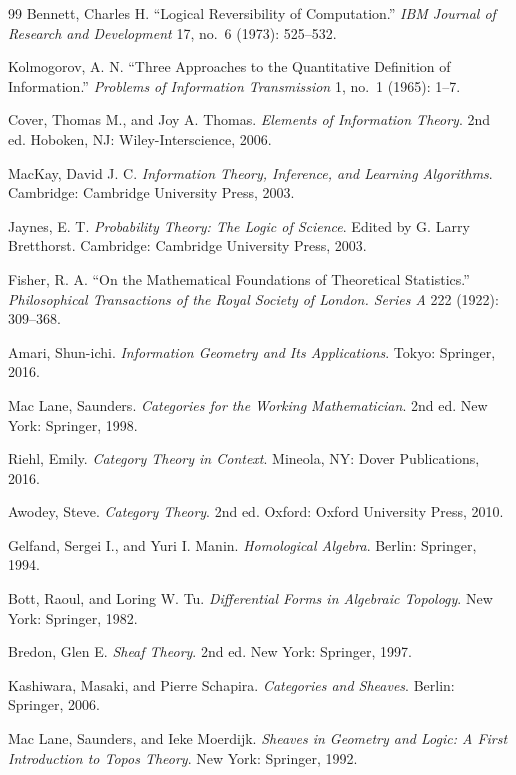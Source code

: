 \documentclass[
  11pt,
  a4paper,
  DIV=12,
  BCOR=0mm,
  parskip=half-
]{scrartcl}
\theoremstyle{definition}
\theoremstyle{plain}
\theoremstyle{remark}
\begin{document}
\begin{thebibliography}{99}
Bennett, Charles H.
``Logical Reversibility of Computation.''
\emph{IBM Journal of Research and Development}
17, no.~6 (1973): 525--532.

Kolmogorov, A. N.
``Three Approaches to the Quantitative Definition of Information.''
\emph{Problems of Information Transmission}
1, no.~1 (1965): 1--7.

Cover, Thomas M., and Joy A. Thomas.
\emph{Elements of Information Theory}.
2nd ed.
Hoboken, NJ: Wiley-Interscience, 2006.

MacKay, David J. C.
\emph{Information Theory, Inference, and Learning Algorithms}.
Cambridge: Cambridge University Press, 2003.

Jaynes, E. T.
\emph{Probability Theory: The Logic of Science}.
Edited by G. Larry Bretthorst.
Cambridge: Cambridge University Press, 2003.

Fisher, R. A.
``On the Mathematical Foundations of Theoretical Statistics.''
\emph{Philosophical Transactions of the Royal Society of London.
Series A}
222 (1922): 309--368.

Amari, Shun-ichi.
\emph{Information Geometry and Its Applications}.
Tokyo: Springer, 2016.

Mac Lane, Saunders.
\emph{Categories for the Working Mathematician}.
2nd ed.
New York: Springer, 1998.

Riehl, Emily.
\emph{Category Theory in Context}.
Mineola, NY: Dover Publications, 2016.

Awodey, Steve.
\emph{Category Theory}.
2nd ed.
Oxford: Oxford University Press, 2010.

Gelfand, Sergei I., and Yuri I. Manin.
\emph{Homological Algebra}.
Berlin: Springer, 1994.

Bott, Raoul, and Loring W. Tu.
\emph{Differential Forms in Algebraic Topology}.
New York: Springer, 1982.

Bredon, Glen E.
\emph{Sheaf Theory}.
2nd ed.
New York: Springer, 1997.

Kashiwara, Masaki, and Pierre Schapira.
\emph{Categories and Sheaves}.
Berlin: Springer, 2006.

Mac Lane, Saunders, and Ieke Moerdijk.
\emph{Sheaves in Geometry and Logic: A First Introduction to Topos Theory}.
New York: Springer, 1992.


\end{thebibliography}
\end{document}

